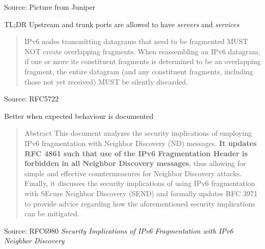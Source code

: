 \documentclass[Screen16to9,17pt]{foils}
\begin{document}

Source: Picture from Juniper\\ {\footnotesize
{}}

\begin{list2}
\item TL;DR Upstream and trunk ports are allowed to have \emph{servers} and \emph{services}
\end{list2}




\begin{quote}
  IPv6 nodes transmitting datagrams that need to be fragmented MUST NOT
   create overlapping fragments.  When reassembling an IPv6 datagram, if
   one or more its constituent fragments is determined to be an
   overlapping fragment, the entire datagram (and any constituent
   fragments, including those not yet received) MUST be silently
   discarded.
\end{quote}
Source: RFC5722

\begin{list2}
\item Better when expected behaviour is documented
\end{list2}



\begin{quote}
Abstract
   This document analyzes the security implications of employing IPv6
   fragmentation with Neighbor Discovery (ND) messages. {\bf  It updates RFC
   4861 such that use of the IPv6 Fragmentation Header is forbidden in
   all Neighbor Discovery messages}, thus allowing for simple and
   effective countermeasures for Neighbor Discovery attacks.  Finally,
   it discusses the security implications of using IPv6 fragmentation
   with SEcure Neighbor Discovery (SEND) and formally updates RFC 3971
   to provide advice regarding how the aforementioned security
   implications can be mitigated.
\end{quote}
Source: RFC6980 \emph{Security Implications of IPv6 Fragmentation with IPv6 Neighbor Discovery}
\end{document}
